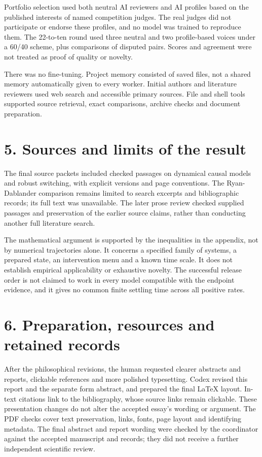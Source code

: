 Portfolio selection used both neutral AI reviewers and AI profiles based on the published interests of named competition judges. The real judges did not participate or endorse these profiles, and no model was trained to reproduce them. The 22-to-ten round used three neutral and two profile-based voices under a 60/40 scheme, plus comparisons of disputed pairs. Scores and agreement were not treated as proof of quality or novelty.

There was no fine-tuning. Project memory consisted of saved files, not a shared memory automatically given to every worker. Initial authors and literature reviewers used web search and accessible primary sources. File and shell tools supported source retrieval, exact comparisons, archive checks and document preparation.

\section*{5. Sources and limits of the result}

The final source packets included checked passages on dynamical causal models and robust switching, with explicit versions and page conventions. The Ryan-Dablander comparison remains limited to search excerpts and bibliographic records; its full text was unavailable. The later prose review checked supplied passages and preservation of the earlier source claims, rather than conducting another full literature search.

The mathematical argument is supported by the inequalities in the appendix, not by numerical trajectories alone. It concerns a specified family of systems, a prepared state, an intervention menu and a known time scale. It does not establish empirical applicability or exhaustive novelty. The successful release order is not claimed to work in every model compatible with the endpoint evidence, and it gives no common finite settling time across all positive rates.

\section*{6. Preparation, resources and retained records}

After the philosophical revisions, the human requested clearer abstracts and reports, clickable references and more polished typesetting. Codex revised this report and the separate form abstract, and prepared the final LaTeX layout. In-text citations link to the bibliography, whose source links remain clickable. These presentation changes do not alter the accepted essay's wording or argument. The PDF checks cover text preservation, links, fonts, page layout and identifying metadata. The final abstract and report wording were checked by the coordinator against the accepted manuscript and records; they did not receive a further independent scientific review.

